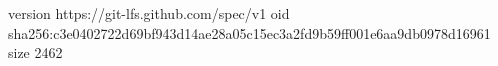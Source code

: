 version https://git-lfs.github.com/spec/v1
oid sha256:c3e0402722d69bf943d14ae28a05c15ec3a2fd9b59ff001e6aa9db0978d16961
size 2462
